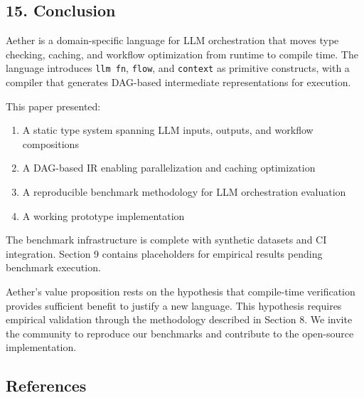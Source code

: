 \documentclass[
]{article}
\newcommand{\passthrough}[1]{#1}
\providecommand{\tightlist}{%
  \setlength{\itemsep}{0pt}\setlength{\parskip}{0pt}}
\begin{document}
\subsection{15. Conclusion}\label{conclusion}

Aether is a domain-specific language for LLM orchestration that moves
type checking, caching, and workflow optimization from runtime to
compile time. The language introduces \passthrough{\lstinline!llm fn!},
\passthrough{\lstinline!flow!}, and \passthrough{\lstinline!context!} as
primitive constructs, with a compiler that generates DAG-based
intermediate representations for execution.

This paper presented:

\begin{enumerate}
\def\labelenumi{\arabic{enumi}.}
\tightlist
\item
  A static type system spanning LLM inputs, outputs, and workflow
  compositions
\item
  A DAG-based IR enabling parallelization and caching optimization
\item
  A reproducible benchmark methodology for LLM orchestration evaluation
\item
  A working prototype implementation
\end{enumerate}

The benchmark infrastructure is complete with synthetic datasets and CI
integration. Section 9 contains placeholders for empirical results
pending benchmark execution.

Aether's value proposition rests on the hypothesis that compile-time
verification provides sufficient benefit to justify a new language. This
hypothesis requires empirical validation through the methodology
described in Section 8. We invite the community to reproduce our
benchmarks and contribute to the open-source implementation.

\subsection{References}\label{references}
\end{document}
